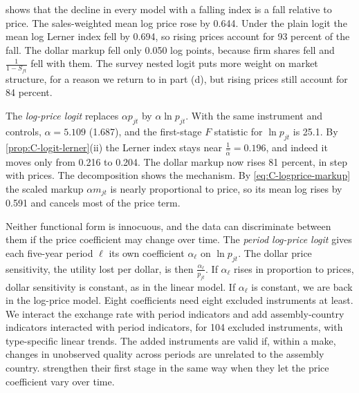  shows that the decline in every model with a falling index is a fall relative to price. The
sales-weighted mean log price rose by 0.644. Under the plain logit the mean log Lerner index fell by 0.694, so rising
prices account for 93 percent of the fall. The dollar markup fell only 0.050 log points, because firm shares fell and
$\frac{1}{1 - S_{ft}}$ fell with them. The survey nested logit puts more weight on market structure, for a reason we
return to in part (d), but rising prices still account for 84 percent.

The \emph{log-price logit} replaces $\alpha p_{jt}$ by $\alpha\ln p_{jt}$. With the same instrument and controls,
$\hat\alpha = 5.109$ (1.687), and the first-stage $F$ statistic for $\ln p_{jt}$ is 25.1. By
\cref{prop:C-logit-lerner}(ii) the Lerner index stays near $\frac{1}{\hat\alpha} = 0.196$, and indeed it moves only from
0.216 to 0.204. The dollar markup now rises 81 percent, in step with prices. The decomposition shows the mechanism.
By \eqref{eq:C-logprice-markup} the scaled markup $\alpha m_{jt}$ is nearly proportional to price, so its mean log
rises by 0.591 and cancels most of the price term.

Neither functional form is innocuous, and the data can discriminate between them if the price coefficient may change
over time. The \emph{period log-price logit} gives each five-year period $\ell$ its own coefficient $\alpha_\ell$ on
$\ln p_{jt}$. The dollar price sensitivity, the utility lost per dollar, is then $\frac{\alpha_\ell}{p_{jt}}$. If
$\alpha_\ell$ rises in proportion to prices, dollar sensitivity is constant, as in the linear model. If $\alpha_\ell$ is
constant, we are back in the log-price model. Eight coefficients need eight excluded instruments at least. We interact
the exchange rate with period indicators and add assembly-country indicators interacted with period indicators, for
104 excluded instruments, with type-specific linear trends. The added instruments are valid if, within a make,
changes in unobserved quality across periods are unrelated to the assembly country. \citet[fn.~10]{GriecoMurryYurukoglu2024}
strengthen their first stage in the same way when they let the price coefficient vary over time.

